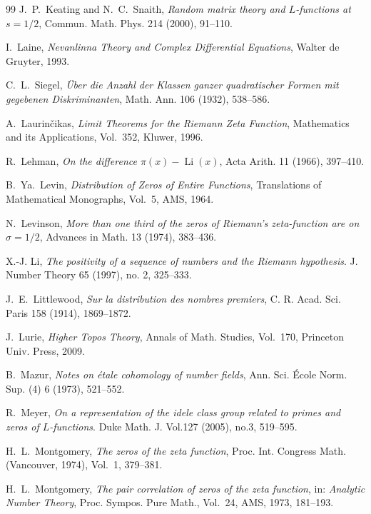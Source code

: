 \documentclass{article}
\begin{document}
\begin{thebibliography}{99}
J.~P.~Keating and N.~C.~Snaith, 
\emph{Random matrix theory and $L$-functions at $s=1/2$}, 
Commun. Math. Phys. 214 (2000), 91--110.

I.~Laine, 
\emph{Nevanlinna Theory and Complex Differential Equations}, 
Walter de Gruyter, 1993.

C.~L.~Siegel, 
\emph{Über die Anzahl der Klassen ganzer quadratischer Formen mit gegebenen Diskriminanten}, 
Math. Ann. 106 (1932), 538--586.

A.~Laurinčikas, 
\emph{Limit Theorems for the Riemann Zeta Function}, 
Mathematics and its Applications, Vol.~352, Kluwer, 1996.

R.~Lehman, 
\emph{On the difference $\pi(x)-\operatorname{Li}(x)$}, 
Acta Arith. 11 (1966), 397--410.

B.~Ya.~Levin, 
\emph{Distribution of Zeros of Entire Functions}, 
Translations of Mathematical Monographs, Vol.~5, AMS, 1964.

N.~Levinson, 
\emph{More than one third of the zeros of Riemann's zeta-function are on $\sigma = 1/2$}, 
Advances in Math. 13 (1974), 383--436.

 X.-J. Li, \emph{
The positivity of a sequence of numbers and the Riemann hypothesis}.
J. Number Theory 65 (1997), no. 2, 325--333.

J.~E.~Littlewood, 
\emph{Sur la distribution des nombres premiers}, 
C. R. Acad. Sci. Paris 158 (1914), 1869--1872.

J.~Lurie, 
\emph{Higher Topos Theory}, 
Annals of Math. Studies, Vol.~170, Princeton Univ. Press, 2009.

B.~Mazur, 
\emph{Notes on étale cohomology of number fields}, 
Ann. Sci. École Norm. Sup. (4) 6 (1973), 521--552.

 R.~Meyer, {\em On a representation of the idele class group
related to primes and zeros of $L$-functions}.  Duke Math. J.
Vol.127 (2005),  no.3, 519--595.

H.~L.~Montgomery, 
\emph{The zeros of the zeta function}, 
Proc. Int. Congress Math. (Vancouver, 1974), Vol.~1, 379--381.

H.~L.~Montgomery, 
\emph{The pair correlation of zeros of the zeta function}, 
in: \emph{Analytic Number Theory}, Proc. Sympos. Pure Math., Vol.~24, AMS, 1973, 181--193.


\end{thebibliography}
\end{document}
